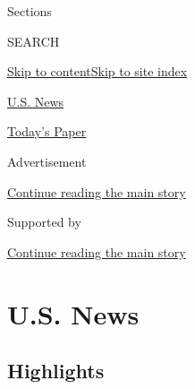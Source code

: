 Sections

SEARCH

\protect\hyperlink{site-content}{Skip to
content}\protect\hyperlink{site-index}{Skip to site index}

\href{https://www.nytimes.com/section/us}{U.S. News}

\href{https://myaccount.nytimes.com/auth/login?response_type=cookie\&client_id=vi}{}

\href{https://www.nytimes.com/section/todayspaper}{Today's Paper}

Advertisement

\protect\hyperlink{after-top}{Continue reading the main story}

Supported by

\protect\hyperlink{after-sponsor}{Continue reading the main story}

\hypertarget{us-news}{%
\section{U.S. News}\label{us-news}}

\hypertarget{highlights}{%
\subsection{Highlights}\label{highlights}}

